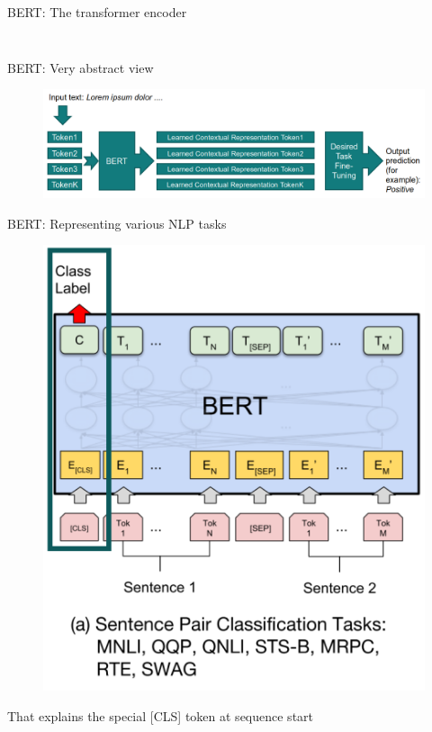 \documentclass[12pt,aspectratio=169,handout]{beamer}
\begin{document}
\begin{frame}{BERT: The transformer encoder}
\begin{columns}
\begin{column}{0.3\linewidth}
\begin{figure}
			\end{figure}
		\end{column}
	\end{columns}
	
\end{frame}

\begin{frame}{BERT: Very abstract view}
	
	\begin{figure}
		\includegraphics[width=\linewidth]{img/bert1.png}
	\end{figure}	
	
\end{frame}


\begin{frame}{BERT: Representing various NLP tasks}
	
	\begin{figure}
		\includegraphics[width=0.5\linewidth]{img/task1.png}
	\end{figure}
	
	That explains the special [CLS] token at sequence start
	
\end{frame}
\end{document}
